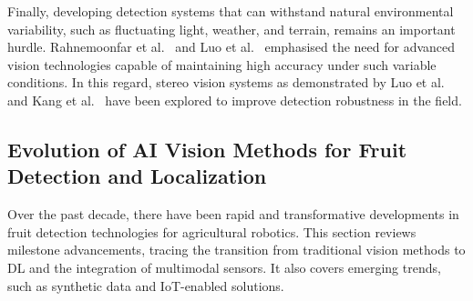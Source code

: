 \documentclass[a4paper,fleqn]{cas-dc}
\begin{document}
Finally, developing detection systems that can withstand natural environmental variability, such as fluctuating light, weather, and terrain, remains an important hurdle. Rahnemoonfar et al.~\cite{rahnemoonfar2017deep} and Luo et al.~\cite{luo2018vision} emphasised the need for advanced vision technologies capable of maintaining high accuracy under such variable conditions. In this regard, stereo vision systems as demonstrated by Luo et al.~\cite{luo2016vision} and Kang et al.~\cite{kang2020real} have been explored to improve detection robustness in the field.

\subsection{Evolution of AI Vision Methods for Fruit Detection and Localization}

Over the past decade, there have been rapid and transformative developments in fruit detection technologies for agricultural robotics. This section reviews milestone advancements, tracing the transition from traditional vision methods to DL and the integration of multimodal sensors. It also covers emerging trends, such as synthetic data and IoT-enabled solutions.
\end{document}
